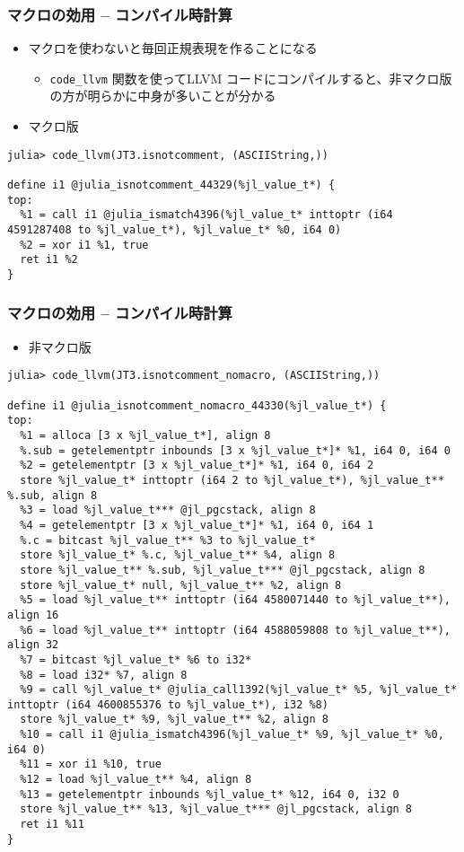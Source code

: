 \begin{frame}[containsverbatim]
\frametitle{マクロの効用 -- コンパイル時計算}
\begin{itemize}
  \item マクロを使わないと毎回正規表現を作ることになる
    \begin{itemize}
      \item \verb|code_llvm| 関数を使ってLLVM コードにコンパイルすると、非マクロ版の方が明らかに中身が多いことが分かる
    \end{itemize}
  \item マクロ版
\end{itemize}
\begin{lstlisting}
julia> code_llvm(JT3.isnotcomment, (ASCIIString,))

define i1 @julia_isnotcomment_44329(%jl_value_t*) {
top:
  %1 = call i1 @julia_ismatch4396(%jl_value_t* inttoptr (i64 4591287408 to %jl_value_t*), %jl_value_t* %0, i64 0)
  %2 = xor i1 %1, true
  ret i1 %2
}
\end{lstlisting}
\end{frame}

\begin{frame}
\frametitle{マクロの効用 -- コンパイル時計算}
\begin{itemize}
  \item 非マクロ版
\end{itemize}
\begin{lstlisting}
julia> code_llvm(JT3.isnotcomment_nomacro, (ASCIIString,))

define i1 @julia_isnotcomment_nomacro_44330(%jl_value_t*) {
top:
  %1 = alloca [3 x %jl_value_t*], align 8
  %.sub = getelementptr inbounds [3 x %jl_value_t*]* %1, i64 0, i64 0
  %2 = getelementptr [3 x %jl_value_t*]* %1, i64 0, i64 2
  store %jl_value_t* inttoptr (i64 2 to %jl_value_t*), %jl_value_t** %.sub, align 8
  %3 = load %jl_value_t*** @jl_pgcstack, align 8
  %4 = getelementptr [3 x %jl_value_t*]* %1, i64 0, i64 1
  %.c = bitcast %jl_value_t** %3 to %jl_value_t*
  store %jl_value_t* %.c, %jl_value_t** %4, align 8
  store %jl_value_t** %.sub, %jl_value_t*** @jl_pgcstack, align 8
  store %jl_value_t* null, %jl_value_t** %2, align 8
  %5 = load %jl_value_t** inttoptr (i64 4580071440 to %jl_value_t**), align 16
  %6 = load %jl_value_t** inttoptr (i64 4588059808 to %jl_value_t**), align 32
  %7 = bitcast %jl_value_t* %6 to i32*
  %8 = load i32* %7, align 8
  %9 = call %jl_value_t* @julia_call1392(%jl_value_t* %5, %jl_value_t* inttoptr (i64 4600855376 to %jl_value_t*), i32 %8)
  store %jl_value_t* %9, %jl_value_t** %2, align 8
  %10 = call i1 @julia_ismatch4396(%jl_value_t* %9, %jl_value_t* %0, i64 0)
  %11 = xor i1 %10, true
  %12 = load %jl_value_t** %4, align 8
  %13 = getelementptr inbounds %jl_value_t* %12, i64 0, i32 0
  store %jl_value_t** %13, %jl_value_t*** @jl_pgcstack, align 8
  ret i1 %11
}
\end{lstlisting}
\end{frame}

